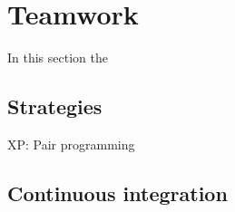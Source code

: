 \section{Teamwork}
In this section the 

\subsection{Strategies}
XP: Pair programming\\

\subsection{Continuous integration}
